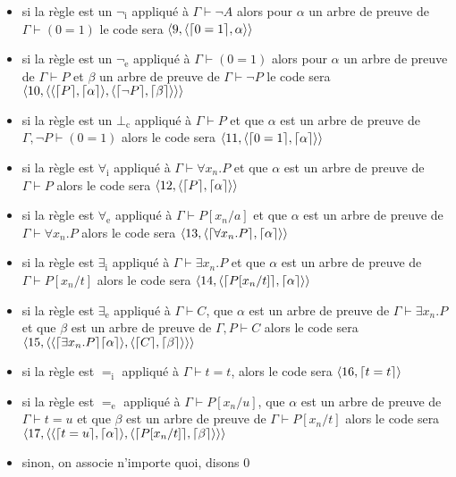 \begin{defi}
\begin{itemize}[label=$\bullet$]
        \item si la règle est un $\lnot_\mathrm i$ appliqué à $\Gamma\vdash \lnot A$ alors pour $\alpha$ un arbre de preuve de $\Gamma\vdash (0=1)$ le code sera $\langle 9,\langle \lceil 0=1 \rceil,\alpha\rangle\rangle$
        \item si la règle est un $\lnot_\mathrm e$ appliqué à $\Gamma\vdash (0=1)$ alors pour $\alpha$ un arbre de preuve de $\Gamma\vdash P$ et $\beta$ un arbre de preuve de $\Gamma\vdash \lnot P$ le code sera $\langle 10,\langle \langle\lceil P \rceil,\lceil \alpha \rceil\rangle,\langle\lceil \lnot P \rceil,\lceil \beta \rceil\rangle\rangle\rangle$
        \item si la règle est un $\bot_\mathrm c$ appliqué à $\Gamma\vdash P$ et que $\alpha$ est un arbre de preuve de $\Gamma,\lnot P\vdash (0=1)$ alors le code sera $\langle 11,\langle\lceil 0=1 \rceil,\lceil \alpha \rceil\rangle\rangle$
        \item si la règle est $\forall_\mathrm i$ appliqué à $\Gamma\vdash \forall x_n.P$ et que $\alpha$ est un arbre de preuve de $\Gamma\vdash P$ alors le code sera $\langle 12,\langle\lceil P \rceil,\lceil \alpha \rceil\rangle\rangle$
        \item si la règle est $\forall_\mathrm e$ appliqué à $\Gamma\vdash P[x_n/a]$ et que $\alpha$ est un arbre de preuve de $\Gamma\vdash \forall x_n.P$ alors le code sera $\langle 13,\langle \lceil \forall x_n.P \rceil,\lceil \alpha \rceil\rangle\rangle$
        \item si la règle est $\exists_\mathrm i$ appliqué à $\Gamma\vdash \exists x_n.P$ et que $\alpha$ est un arbre de preuve de $\Gamma\vdash P[x_n/t]$ alors le code sera $\langle 14,\langle \lceil P[x_n/t] \rceil,\lceil \alpha \rceil\rangle\rangle$
        \item si la règle est $\exists_\mathrm e$ appliqué à $\Gamma\vdash C$, que $\alpha$ est un arbre de preuve de $\Gamma\vdash \exists x_n.P$ et que $\beta$ est un arbre de preuve de $\Gamma,P\vdash C$ alors le code sera $\langle 15,\langle\langle\lceil \exists x_n.P \rceil\lceil \alpha \rceil\rangle,\langle\lceil C \rceil,\lceil \beta \rceil\rangle\rangle\rangle$
        \item si la règle est $=_\mathrm i$ appliqué à $\Gamma\vdash t=t$, alors le code sera $\langle 16,\lceil t=t \rceil\rangle$
        \item si la règle est $=_\mathrm e$ appliqué à $\Gamma\vdash P[x_n/u]$, que $\alpha$ est un arbre de preuve de $\Gamma\vdash t = u$ et que $\beta$ est un arbre de preuve de $\Gamma\vdash P[x_n/t]$ alors le code sera $\langle 17,\langle\langle\lceil t=u \rceil,\lceil \alpha \rceil\rangle,\langle\lceil P[x_n/t] \rceil,\lceil \beta \rceil\rangle\rangle\rangle$
        \item sinon, on associe n'importe quoi, disons $0$
    \end{itemize}
\end{defi}

